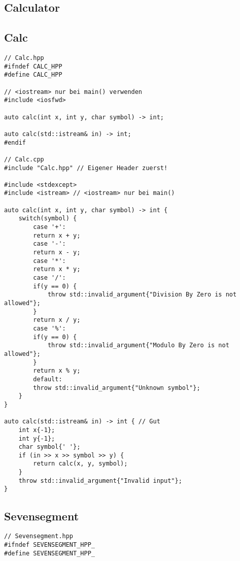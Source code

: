 

\newcommand{\TITLE}{C++ Code Overview}
\newcommand{\AUTHOR}{Mona Panchaud}
\newcommand{\INSTITUTE}{Ostschweizer Fachhochschule}



\begin{multicols*}{3}


\section{Calculator}
\subsection{Calc}
\begin{verbatim}
// Calc.hpp
#ifndef CALC_HPP
#define CALC_HPP

// <iostream> nur bei main() verwenden
#include <iosfwd>

auto calc(int x, int y, char symbol) -> int;

auto calc(std::istream& in) -> int;
#endif

// Calc.cpp
#include "Calc.hpp" // Eigener Header zuerst!

#include <stdexcept>
#include <istream> // <iostream> nur bei main()

auto calc(int x, int y, char symbol) -> int {
    switch(symbol) {
        case '+':
        return x + y;
        case '-':
        return x - y;
        case '*':
        return x * y;
        case '/':
        if(y == 0) {
            throw std::invalid_argument{"Division By Zero is not allowed"};
        }
        return x / y;
        case '%':
        if(y == 0) {
            throw std::invalid_argument{"Modulo By Zero is not allowed"};
        }
        return x % y;
        default:
        throw std::invalid_argument{"Unknown symbol"};
    }
}

auto calc(std::istream& in) -> int { // Gut
    int x{-1};
    int y{-1};
    char symbol{' '};
    if (in >> x >> symbol >> y) {
        return calc(x, y, symbol);
    }
    throw std::invalid_argument{"Invalid input"};
}
\end{verbatim}

\subsection{Sevensegment}
\begin{verbatim}
// Sevensegment.hpp
#ifndef SEVENSEGMENT_HPP_
#define SEVENSEGMENT_HPP_


\end{verbatim}
\end{multicols*}
